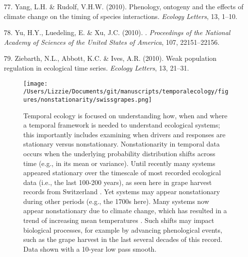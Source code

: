 \documentclass[11pt,a4paper,oneside]{article}
\begin{document}
\begin{thebibliography}{79}
77. Yang, L.H. \& Rudolf, V.H.W. (2010).
\newblock Phenology, ontogeny and the effects of climate change on the timing
  of species interactions.
\newblock \emph{Ecology Letters}, 13, 1--10.

78. Yu, H.Y., Luedeling, E. \& Xu, J.C. (2010).
.
\newblock \emph{Proceedings of the National Academy of Sciences of the United
  States of America}, 107, 22151--22156.

79. Ziebarth, N.L., Abbott, K.C. \& Ives, A.R. (2010).
\newblock Weak population regulation in ecological time series.
\newblock \emph{Ecology Letters}, 13, 21--31.

\end{thebibliography}

\newpage


\begin{figure}[h!]
\centering
\noindent \texttt{[image: /Users/Lizzie/Documents/git/manuscripts/temporalecology/figures/nonstationarity/swissgrapes.png]}
\caption{Temporal ecology is focused on understanding how, when and where a temporal framework is needed to understand ecological systems; this importantly includes examining when drivers and responses are stationary versus nonstationary. Nonstationarity in temporal data occurs when the underlying probability distribution shifts across time (e.g., in its mean or variance). Until recently many systems appeared stationary over the timescale of most recorded ecological data (i.e., the last 100-200 years), as seen here in grape harvest records from Switzerland \citep{Meier:2007zh}. Yet systems may appear nonstationary during other periods (e.g., the 1700s here). Many systems now appear nonstationary due to climate change, which has resulted in a trend of increasing mean temperatures \citep{Huntingford2013}. Such shifts may impact biological processes, for example by advancing phenological events, such as the grape harvest in the last several decades of this record. Data shown with a 10-year low pass smooth.}
\end{figure}
\end{document}
